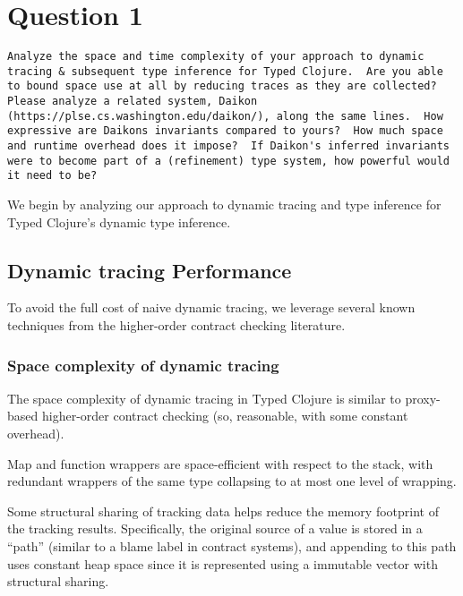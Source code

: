 \section{Question 1}

\begin{verbatim}
Analyze the space and time complexity of your approach to dynamic
tracing & subsequent type inference for Typed Clojure.  Are you able
to bound space use at all by reducing traces as they are collected?
Please analyze a related system, Daikon
(https://plse.cs.washington.edu/daikon/), along the same lines.  How
expressive are Daikons invariants compared to yours?  How much space
and runtime overhead does it impose?  If Daikon's inferred invariants
were to become part of a (refinement) type system, how powerful would
it need to be?
\end{verbatim}

We begin by analyzing our approach to dynamic tracing and type inference
for Typed Clojure's dynamic type inference.

\subsection{Dynamic tracing Performance}

To avoid the full cost of naive dynamic tracing, we leverage several
known techniques from the higher-order contract checking literature.

\subsubsection{Space complexity of dynamic tracing}

The space complexity of dynamic tracing in Typed Clojure is similar
to proxy-based higher-order contract checking (so, reasonable, with
some constant overhead).

Map and function wrappers are space-efficient with respect to the stack, with
redundant wrappers of the same type collapsing to at most one level of wrapping.

Some structural sharing of tracking data helps reduce the memory footprint
of the tracking results. Specifically, the original source of a value
is stored in a ``path'' (similar to a blame label in contract systems),
and appending to this path uses constant heap space since it is represented
using a immutable vector with structural sharing.


